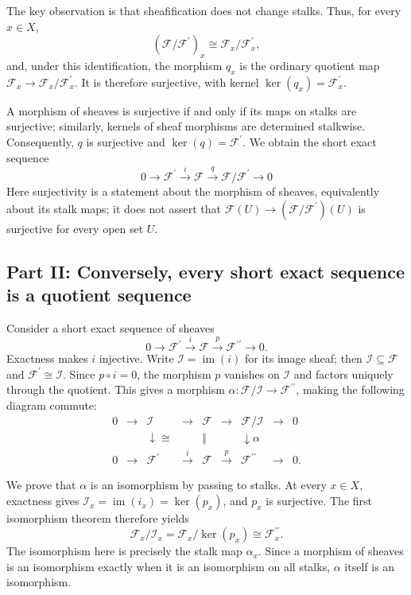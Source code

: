 The key observation is that sheafification does not change stalks. Thus, for
every \(x\in X\),
\[
(\mathcal{F}/\mathcal{F}^{\prime})_x
\cong \mathcal{F}_x/\mathcal{F}^{\prime}_x,
\]
and, under this identification, the morphism \(q_x\) is the ordinary quotient
map \(\mathcal{F}_x\to\mathcal{F}_x/\mathcal{F}^{\prime}_x\). It is therefore
surjective, with kernel \(\ker(q_x)=\mathcal{F}^{\prime}_x\).

A morphism of sheaves is surjective if and only if its maps on stalks are
surjective; similarly, kernels of sheaf morphisms are determined stalkwise.
Consequently, \(q\) is surjective and \(\ker(q)=\mathcal{F}^{\prime}\). We obtain
the short exact sequence
\[
\boxed{
0\longrightarrow\mathcal{F}^{\prime}
\xrightarrow{i}\mathcal{F}
\xrightarrow{q}\mathcal{F}/\mathcal{F}^{\prime}
\longrightarrow 0
}
\]
Here surjectivity is a statement about the morphism of sheaves, equivalently
about its stalk maps; it does not assert that
\(\mathcal{F}(U)\to(\mathcal{F}/\mathcal{F}^{\prime})(U)\) is surjective for
every open set \(U\).

\subsection{Part II: Conversely, every short exact sequence is a quotient sequence}

Consider a short exact sequence of sheaves
\[
0\longrightarrow\mathcal{F}^{\prime}
\xrightarrow{i}\mathcal{F}
\xrightarrow{p}\mathcal{F}^{\prime\prime}
\longrightarrow 0.
\]
Exactness makes \(i\) injective. Write \(\mathcal I=\operatorname{im}(i)\) for
its image sheaf; then \(\mathcal I\subseteq\mathcal{F}\) and
\(\mathcal{F}^{\prime}\cong\mathcal I\). Since \(p\circ i=0\), the morphism
\(p\) vanishes on \(\mathcal I\) and factors uniquely through the quotient.
This gives a morphism
\(\alpha:\mathcal{F}/\mathcal I\to\mathcal{F}^{\prime\prime}\), making the
following diagram commute:
\[
\begin{array}{ccccccccc}
 0 & \longrightarrow & \mathcal I & \longrightarrow & \mathcal{F}
   & \longrightarrow & \mathcal{F}/\mathcal I & \longrightarrow & 0 \\
 & & \downarrow\scriptstyle\cong & & \Vert & & \downarrow\scriptstyle\alpha & & \\
 0 & \longrightarrow & \mathcal{F}^{\prime} & \xrightarrow{i} & \mathcal{F}
   & \xrightarrow{p} & \mathcal{F}^{\prime\prime} & \longrightarrow & 0.
\end{array}
\]

We prove that \(\alpha\) is an isomorphism by passing to stalks. At every
\(x\in X\), exactness gives
\(\mathcal I_x=\operatorname{im}(i_x)=\ker(p_x)\), and \(p_x\) is
surjective. The first isomorphism theorem therefore yields
\[
\mathcal{F}_x/\mathcal I_x
=\mathcal{F}_x/\ker(p_x)
\cong\mathcal{F}^{\prime\prime}_x.
\]
The isomorphism here is precisely the stalk map \(\alpha_x\). Since a
morphism of sheaves is an isomorphism exactly when it is an isomorphism on
all stalks, \(\alpha\) itself is an isomorphism.

